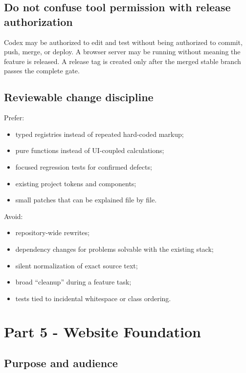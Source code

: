 \documentclass[11pt,letterpaper]{article}
\begin{document}
\subsection{Do not confuse tool permission with release authorization}

Codex may be authorized to edit and test without being authorized to commit,
push, merge, or deploy. A browser server may be running without meaning the
feature is released. A release tag is created only after the merged stable
branch passes the complete gate.

\subsection{Reviewable change discipline}

Prefer:

\begin{itemize}
    \item typed registries instead of repeated hard-coded markup;
    \item pure functions instead of UI-coupled calculations;
    \item focused regression tests for confirmed defects;
    \item existing project tokens and components;
    \item small patches that can be explained file by file.
\end{itemize}

Avoid:

\begin{itemize}
    \item repository-wide rewrites;
    \item dependency changes for problems solvable with the existing stack;
    \item silent normalization of exact source text;
    \item broad ``cleanup'' during a feature task;
    \item tests tied to incidental whitespace or class ordering.
\end{itemize}

\section{Part 5 - Website Foundation}

\subsection{Purpose and audience}
\end{document}

